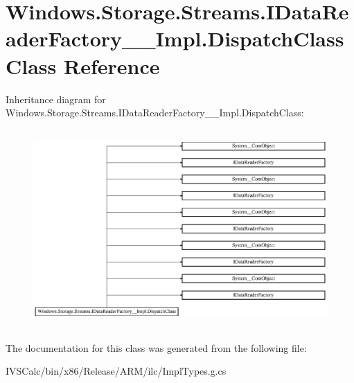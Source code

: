 \hypertarget{class_windows_1_1_storage_1_1_streams_1_1_i_data_reader_factory_____impl_1_1_dispatch_class}{}\section{Windows.\+Storage.\+Streams.\+I\+Data\+Reader\+Factory\+\_\+\+\_\+\+Impl.\+Dispatch\+Class Class Reference}
\label{class_windows_1_1_storage_1_1_streams_1_1_i_data_reader_factory_____impl_1_1_dispatch_class}
Inheritance diagram for Windows.\+Storage.\+Streams.\+I\+Data\+Reader\+Factory\+\_\+\+\_\+\+Impl.\+Dispatch\+Class\+:\begin{figure}[H]
\begin{center}
\leavevmode
\includegraphics[height=7.604939cm]{class_windows_1_1_storage_1_1_streams_1_1_i_data_reader_factory_____impl_1_1_dispatch_class}
\end{center}
\end{figure}


The documentation for this class was generated from the following file\+:\begin{DoxyCompactItemize}
\item 
I\+V\+S\+Calc/bin/x86/\+Release/\+A\+R\+M/ilc/Impl\+Types.\+g.\+cs\end{DoxyCompactItemize}
